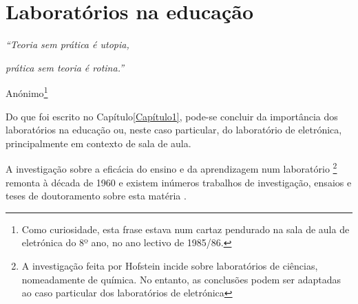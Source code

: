 
\section{Laboratórios na educação}
\label{Laboratóriosnaeducação}

\begin{center}
    \textit{``Teoria sem prática é utopia,}

    \textit{prática sem teoria é rotina.''}

    Anónimo\footnote{Como curiosidade, esta frase estava num cartaz pendurado na sala de aula de eletrónica do 8º ano, no ano lectivo de 1985/86.}
\end{center}

Do que foi escrito no Capítulo\ref{Capítulo1}, pode-se concluir da importância dos laboratórios na educação ou, neste caso particular, do laboratório de eletrónica, principalmente em contexto de sala de aula.

A investigação sobre a eficácia do ensino e da aprendizagem num laboratório \footnote{A investigação feita por Hofstein \cite{Hofstein} incide sobre laboratórios de ciências, nomeadamente de química. No entanto, as conclusões podem ser adaptadas ao caso particular dos laboratórios de eletrónica} remonta à década de 1960 e existem inúmeros trabalhos de investigação, ensaios e teses de doutoramento sobre esta matéria \cite{Hofstein}.

